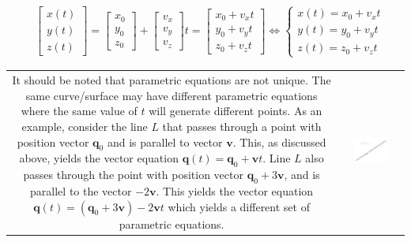 \documentclass{article}
\begin{document}
\begin{align*}
& \begin{bmatrix} x(t) \\ y(t) \\ z(t) \end{bmatrix} = \begin{bmatrix} x_0 \\ y_0 \\ z_0 \end{bmatrix} + \begin{bmatrix} v_x \\ v_y \\ v_z \end{bmatrix}t = \begin{bmatrix} x_0 + v_x t \\ y_0 + v_y t \\ z_0 + v_z t \end{bmatrix} 
\iff \left\{\begin{array}{c} x(t) = x_0 + v_x t \\ y(t) = y_0 + v_y t \\ z(t) = z_0 + v_z t \end{array}\right.
\end{align*}

\begin{tabular}{cc}
\parbox{0.4\textwidth}{
It should be noted that parametric equations are not unique. The same curve/surface may have different parametric equations where the same value of \(t\) will generate different points. As an example, consider the line \(L\) that passes through a point with position vector \(\mathbf{q}_0\) and is parallel to vector \(\mathbf{v}\). This, as discussed above, yields the vector equation \(\mathbf{q}(t) = \mathbf{q}_0 + \mathbf{v}t\). Line \(L\) also passes through the point with position vector \(\mathbf{q}_0 + 3\mathbf{v}\), and is parallel to the vector \(-2\mathbf{v}\). This yields the vector equation \(\mathbf{q}(t) = (\mathbf{q}_0 + 3\mathbf{v}) - 2\mathbf{v}t\) which yields a different set of parametric equations.
} & \parbox{0.6\textwidth}{
\includegraphics[width = 0.6\textwidth]{multiple_parameterizations}
}
\end{tabular}
\end{document}
